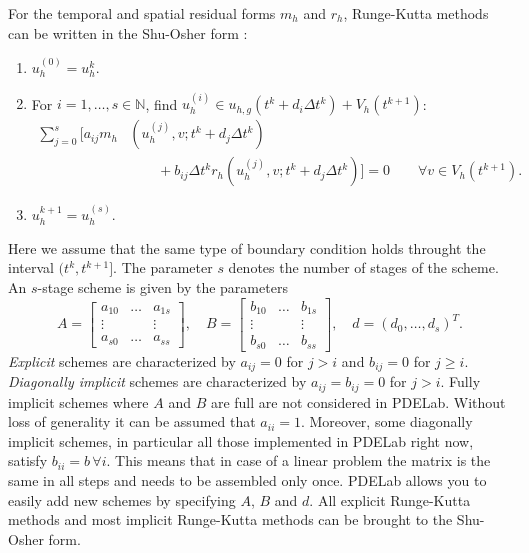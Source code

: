 \documentclass[a4paper,12pt]{article}
\begin{document}
For the temporal and spatial residual forms $m_h$ and $r_h$, Runge-Kutta
methods can be written in the Shu-Osher form
\cite{shu_osher_88,gottlieb2011strong}:
\begin{enumerate}
\item $u_h^{(0)} = u_h^{k}$.
\item For $i=1,\ldots,s\in\mathbb{N}$, find $u_h^{(i)}\in u_{h,g}(t^k+d_i \Delta t^k)
+ V_h(t^{k+1})$:
\begin{equation*}
\begin{split}
\sum\limits_{j=0}^{s} \biggl[a_{ij} m_h&\left(u_h^{(j)},v;t^k+d_j \Delta t^k\right) \\
&\qquad + b_{ij} \Delta t^k r_h\left(u_h^{(j)}, v;t^k+d_j \Delta t^k\right) \biggr] = 0
\qquad \forall v\in V_h(t^{k+1}).
\end{split}
\end{equation*}
\item $u_h^{k+1} = u_h^{(s)}$.
\end{enumerate}
Here we assume that the same type of boundary condition
holds throught the interval $(t^k,t^{k+1}]$. The parameter $s$ denotes
the number of stages of the scheme.
An $s$-stage scheme is given by the parameters
\begin{equation*}
A = \left[\begin{array}{ccc}
a_{10} & \ldots & a_{1s}\\
\vdots &  & \vdots\\
a_{s0} & \ldots & a_{ss}
\end{array}\right],
\quad B = \left[\begin{array}{ccc}
b_{10} & \ldots & b_{1s}\\
\vdots &  & \vdots\\
b_{s0} & \ldots & b_{ss}
\end{array}\right],
\quad d = \left(
d_{0}, \ldots, d_{s}
\right)^T.
\end{equation*}
\textit{Explicit} schemes are characterized by $a_{ij} = 0$ for $j>i$ and $b_{ij}=0$ for $j\geq i$.
\textit{Diagonally implicit} schemes are characterized by $a_{ij} = b_{ij}= 0$ for $j>i$.
Fully implicit schemes where $A$ and $B$ are full are not considered in PDELab.
Without loss of generality it can be assumed that $a_{ii}=1$. Moreover,
some diagonally implicit schemes, in particular all those implemented in PDELab right
now, satisfy $b_{ii}=b\,\forall i$. This means that in case of a linear problem the matrix is the
same in all steps and needs to be assembled only once.
PDELab allows you to easily add new schemes by specifying $A$, $B$ and $d$.
All explicit Runge-Kutta methods and most implicit Runge-Kutta methods
can be brought to the Shu-Osher form.
\end{document}
